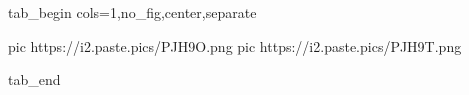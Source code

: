  
 
 
 
 


\ifcmt
  tab_begin cols=1,no_fig,center,separate

     pic https://i2.paste.pics/PJH9O.png
		 pic https://i2.paste.pics/PJH9T.png

  tab_end
\fi
